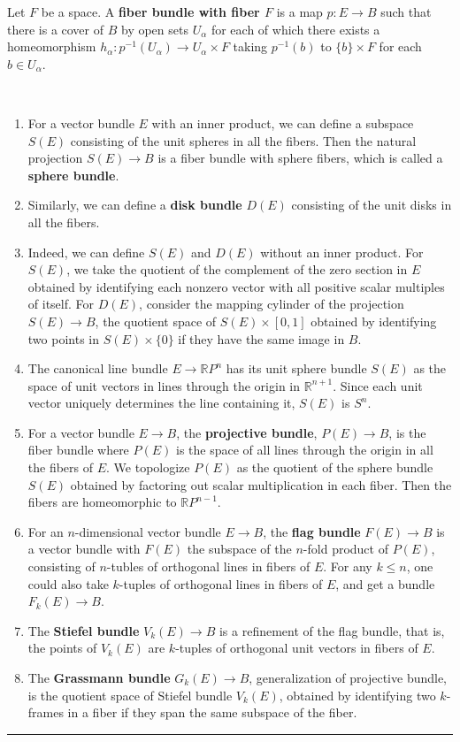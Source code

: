 \begin{defn} Let $F$ be a space. A \textbf{fiber bundle with fiber $F$} is a map $p:E\rightarrow B$ such that there is a cover of $B$ by open sets $U_\alpha$ for each of which there exists a homeomorphism $h_\alpha:p^{-1}(U_\alpha)\rightarrow U_\alpha\times F$ taking $p^{-1}(b)$ to $\{b\}\times F$ for each $b\in U_\alpha$.
\end{defn}

\begin{exmp}
~\begin{enumerate}
\item For a vector bundle $E$ with an inner product, we can define a subspace $S(E)$ consisting of the unit spheres in all the fibers. Then the natural projection $S(E)\rightarrow B$ is a fiber bundle with sphere fibers, which is called a \textbf{sphere bundle}.
\item Similarly, we can define a \textbf{disk bundle} $D(E)$ consisting of the unit disks in all the fibers.
\item Indeed, we can define $S(E)$ and $D(E)$ without an inner product. For $S(E)$, we take the quotient of the complement of the zero section in $E$ obtained by identifying each nonzero vector with all positive scalar multiples of itself. For $D(E)$, consider the mapping cylinder of the projection $S(E)\rightarrow B$, the quotient space of $S(E)\times[0,1]$ obtained by identifying two points in $S(E)\times \{0\}$ if they have the same image in $B$.
\item The canonical line bundle $E\rightarrow \mathbb{R}P^n$ has its unit sphere bundle $S(E)$ as the space of unit vectors in lines through the origin in $\mathbb{R}^{n+1}$. Since each unit vector uniquely determines the line containing it, $S(E)$ is $S^n$.
\item For a vector bundle $E\rightarrow B$, the \textbf{projective bundle}, $P(E)\rightarrow B$, is the fiber bundle where $P(E)$ is the space of all lines through the origin in all the fibers of $E$. We topologize $P(E)$ as the quotient of the sphere bundle $S(E)$ obtained by factoring out scalar multiplication in each fiber. Then the fibers are homeomorphic to $\mathbb{R}P^{n-1}$.
\item For an $n$-dimensional vector bundle $E\rightarrow B$, the \textbf{flag bundle} $F(E)\rightarrow B$ is a vector bundle with $F(E)$ the subspace of the $n$-fold product of $P(E)$, consisting of $n$-tubles of orthogonal lines in fibers of $E$. For any $k\leq n$, one could also take $k$-tuples of orthogonal lines in fibers of $E$, and get a bundle $F_k(E)\rightarrow B$.
\item The \textbf{Stiefel bundle} $V_k(E)\rightarrow B$ is a refinement of the flag bundle, that is, the points of $V_k(E)$ are $k$-tuples of orthogonal unit vectors in fibers of $E$.
\item The \textbf{Grassmann bundle} $G_k(E)\rightarrow B$, generalization of projective bundle, is the quotient space of Stiefel bundle $V_k(E)$, obtained by identifying two $k$-frames in a fiber if they span the same subspace of the fiber.
\end{enumerate}
\end{exmp}
\noindent\rule{\textwidth}{1pt}
\newline